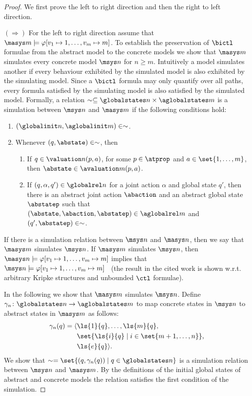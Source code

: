 \begin{proof}
We first prove the left to right direction and then the right to left direction.

$\boldsymbol{(\Longrightarrow)}$ For the left to right direction assume that  $\masys m \models
\varphi[v_1 \mapsto 1, \ldots, v_m \mapsto m]$.  To establish the preservation
of $\bictl$ formulae from the abstract model to the concrete models we show that
$\masys m$ simulates every concrete model $\msys n$ for $n \geq m$. Intuitively
a model simulates another if every behaviour exhibited by the simulated model is
also exhibited by the simulating model.  Since a $\bictl$ formula may only
quantify over all paths, every formula satisfied by the simulating model is also
satisfied by the simulated model.  Formally,  a relation $\sim \subseteq
\globalstates n \times \aglobalstates m$ is a simulation between $\msys n$ and
$\masys m$ if the following conditions hold:
\begin{enumerate}
  \item $(\globalinit n, \aglobalinit m) \in \sim$.
  \item Whenever $(q, \abstate) \in \sim$, then
  \begin{enumerate}
    \item If $q \in \valuation n(p,a)$, for some $p \in \atprop$ and $a \in
    \set{1,\ldots,m}$, then $\abstate \in \avaluation m(p, a)$.
    \item If $(q, \alpha, q') \in \globalrel n$ for a joint action $\alpha$ and
    global state $q'$, then there is an abstract joint action
    $\abaction$ and an abstract global state $\abstatep$ such that
    $(\abstate, \abaction, \abstatep) \in \aglobalrel m$ and
    $(q', \abstatep) \in \sim$. 
    \end{enumerate}
\end{enumerate}
If there is a simulation relation between $\msys n$ and $\masys n$, then we say
that $\masys m$ simulates $\msys n$. If $\masys m$ simulates $\msys n$, then
$\masys n \models \varphi[v_1 \mapsto 1, \ldots, v_m \mapsto m]$ implies that
$\msys n \models \varphi[v_1 \mapsto 1, \ldots, v_m \mapsto
m]$~\cite{ClarkeGrumbergLong94} (the result in the cited work is shown w.r.t. 
arbitrary Kripke structures and unbounded $\ctl$ formulae).

In the following we show that $\masys m$ simulates $\msys n$. Define $\gamma_n
\colon \globalstates n \rightarrow \aglobalstates m$ to map concrete states in
$\msys n$ to abstract states in $\masys m$ as follows:
\begin{align*}
  \gamma_n(q) =  \langle &\ls{1}{q}, \ldots, \ls{m}{q}, \\
  &\set{\ls{i}{q} \mid i \in \set{m + 1, \ldots, n}}, \\
  &\ls{e}{q}  \rangle.
\end{align*}
We show that $\sim = \set{(q, \gamma_n(q)) \mid q \in \globalstates n }$ is a
simulation relation between $\msys n$ and $\masys m$. By the definitions of the
initial global states of abstract and concrete models the relation satisfies the
first condition of the simulation. 


\end{proof}
